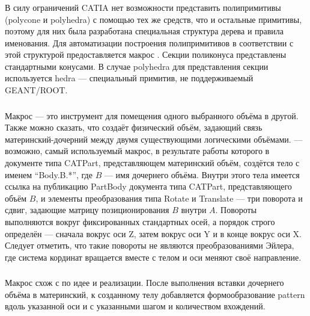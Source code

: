 \subsubsection{}\label{sec:Poly}

В силу ограничений CATIA нет возможности представить полипримитивы (polycone и polyhedra) с помощью тех же средств, что и остальные примитивы, поэтому для них была разработана специальная структура дерева и правила именования. Для автоматизации построения полипримитивов в соответствии с этой структурой предоставляется макрос . Секции поликонуса представлены стандартными конусами. В случае polyhedra для представления секции используется hedra --- специальный примитив, не поддерживаемый GEANT/ROOT.

\subsubsection{}\label{sec:Inserter}

Макрос  --- это инструмент для помещения одного выбранного объёма в другой. Также можно сказать, что  создаёт физический объём, задающий связь материнский-дочерний между двумя существующими логическими объёмами.  --- возможно, самый используемый макрос, в результате работы которого в документе типа CATPart, представляющем материнский объём, создётся тело с именем ``Body.B.*'', где $B$ --- имя дочернего объёма. Внутри этого тела имеется ссылка на публикацию PartBody документа типа CATPart, представляющего объём $B$, и элементы преобразования типа Rotate и Translate --- три поворота и сдвиг, задающие матрицу позиционирования $B$ внутри $A$. Повороты выполняются вокруг фиксированных стандартных осей, а порядок строго определён --- сначала вокрус оси Z, затем вокрус оси Y и в конце вокрус оси X. Следует отметить, что такие повороты не являются преобразованиями Эйлера, где система кординат вращается вместе с телом и оси меняют своё направление.

\subsubsection{}\label{sec:ArrayMaker}


Макрос  схож с  по идее и реализации. После выполнения вставки дочернего объёма в материнский, к созданному телу добавляется формообразование pattern вдоль указанной оси и с указанными шагом и количеством вхождений.

